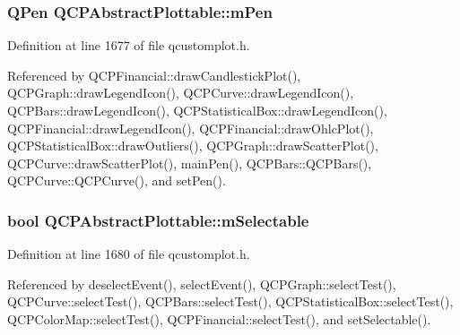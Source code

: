 \hypertarget{class_q_c_p_abstract_plottable_a67bc0622fd1b9fa14e54c14922dcec66}{}
\subsubsection[{m\+Pen}]{\setlength{\rightskip}{0pt plus 5cm}Q\+Pen Q\+C\+P\+Abstract\+Plottable\+::m\+Pen\hspace{0.3cm}{\ttfamily [protected]}}\label{class_q_c_p_abstract_plottable_a67bc0622fd1b9fa14e54c14922dcec66}


Definition at line 1677 of file qcustomplot.\+h.



Referenced by Q\+C\+P\+Financial\+::draw\+Candlestick\+Plot(), Q\+C\+P\+Graph\+::draw\+Legend\+Icon(), Q\+C\+P\+Curve\+::draw\+Legend\+Icon(), Q\+C\+P\+Bars\+::draw\+Legend\+Icon(), Q\+C\+P\+Statistical\+Box\+::draw\+Legend\+Icon(), Q\+C\+P\+Financial\+::draw\+Legend\+Icon(), Q\+C\+P\+Financial\+::draw\+Ohlc\+Plot(), Q\+C\+P\+Statistical\+Box\+::draw\+Outliers(), Q\+C\+P\+Graph\+::draw\+Scatter\+Plot(), Q\+C\+P\+Curve\+::draw\+Scatter\+Plot(), main\+Pen(), Q\+C\+P\+Bars\+::\+Q\+C\+P\+Bars(), Q\+C\+P\+Curve\+::\+Q\+C\+P\+Curve(), and set\+Pen().

\hypertarget{class_q_c_p_abstract_plottable_aceee52342c8e75727abcbd164986fdcb}{}
\subsubsection[{m\+Selectable}]{\setlength{\rightskip}{0pt plus 5cm}bool Q\+C\+P\+Abstract\+Plottable\+::m\+Selectable\hspace{0.3cm}{\ttfamily [protected]}}\label{class_q_c_p_abstract_plottable_aceee52342c8e75727abcbd164986fdcb}


Definition at line 1680 of file qcustomplot.\+h.



Referenced by deselect\+Event(), select\+Event(), Q\+C\+P\+Graph\+::select\+Test(), Q\+C\+P\+Curve\+::select\+Test(), Q\+C\+P\+Bars\+::select\+Test(), Q\+C\+P\+Statistical\+Box\+::select\+Test(), Q\+C\+P\+Color\+Map\+::select\+Test(), Q\+C\+P\+Financial\+::select\+Test(), and set\+Selectable().

